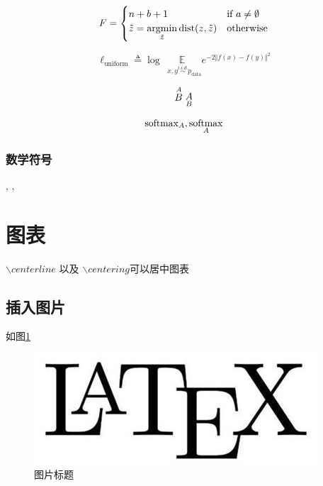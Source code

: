 \begin{equation}
  F = 
  \begin{cases}
    n + b + 1 & \text{if $a \neq \emptyset$}\\

    \tilde{z} = \operatornamewithlimits{argmin}\limits_{\tilde{z}}\operatorname{dist}(z, \tilde{z}) & \text{otherwise}
  \end{cases}
\end{equation}

\begin{equation}
    \ell_{\mathrm{uniform}}\triangleq\log \underset{~~~x, y\stackrel{i.i.d.}{\sim} p_{\mathrm{data}}}{\mathbb{E}}   e^{-2\Vert f(x)-f(y) \Vert^2}
\end{equation}

\begin{equation}
    \stackrel{A}{B} \\ 
    \underset{B}{A}
\end{equation}

\begin{align}
    \operatorname{softmax}_A, \operatornamewithlimits{softmax}_A
\end{align}


\subsubsection{数学符号}

\checkmark, \cmark ,\xmark

\section{图表}
$\backslash centerline{}$ 以及 $\backslash centering$可以居中图表

\subsection{插入图片}
如图\ref{fig:myfig1}
\begin{figure}[htbp]
\centering
\includegraphics[width = .8\textwidth]{figure/Latex.jpg}
\caption{图片标题}
\label{fig:myfig1}
\end{figure}

